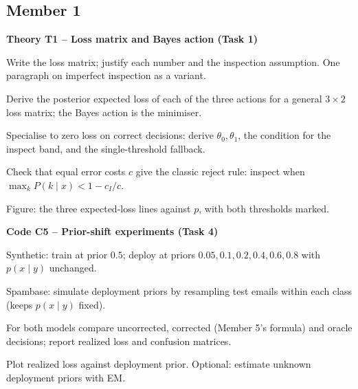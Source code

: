 \documentclass[11pt,a4paper]{article}
\begin{document}
\subsection*{Member 1}
\textbf{Theory T1 -- Loss matrix and Bayes action (Task 1)}
\begin{todo}
  \item Write the loss matrix; justify each number and the inspection assumption. One paragraph on imperfect inspection as a variant.
  \item Derive the posterior expected loss of each of the three actions for a general $3\times 2$ loss matrix; the Bayes action is the minimiser.
  \item Specialise to zero loss on correct decisions: derive $\theta_0,\theta_1$, the condition for the inspect band, and the single-threshold fallback.
  \item Check that equal error costs $c$ give the classic reject rule: inspect when $\max_k P(k\mid x) < 1 - c_I/c$.
  \item Figure: the three expected-loss lines against $p$, with both thresholds marked.
\end{todo}
\textbf{Code C5 -- Prior-shift experiments (Task 4)}
\begin{todo}
  \item Synthetic: train at prior $0.5$; deploy at priors $0.05, 0.1, 0.2, 0.4, 0.6, 0.8$ with $p(x\mid y)$ unchanged.
  \item Spambase: simulate deployment priors by resampling test emails within each class (keeps $p(x\mid y)$ fixed).
  \item For both models compare uncorrected, corrected (Member 5's formula) and oracle decisions; report realized loss and confusion matrices.
  \item Plot realized loss against deployment prior. Optional: estimate unknown deployment priors with EM.
\end{todo}
\end{document}
